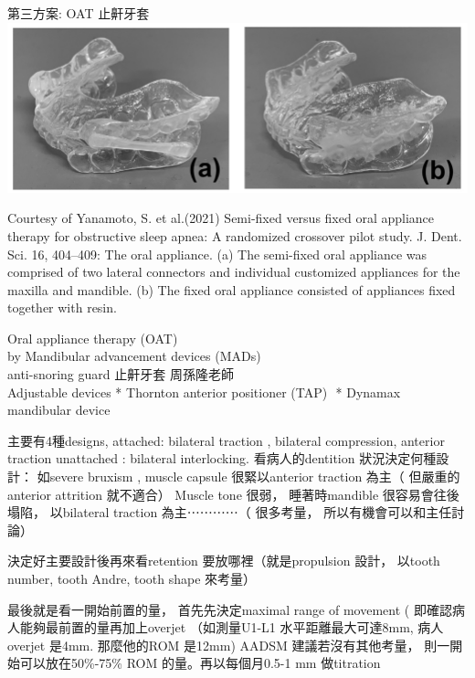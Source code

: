 \documentclass[aspectratio=169]{beamer}
\begin{document}
\begin{frame}{第三方案: OAT 止鼾牙套}
\centering
\includegraphics[height=0.30\textwidth]{Yanamoto2021.jpg}
\par Courtesy of Yanamoto, S. et al.(2021) Semi-fixed versus fixed oral appliance therapy for obstructive sleep apnea: A randomized crossover pilot study. J. Dent. Sci. 16, 404–409: The oral appliance. (a) The semi-fixed oral appliance was comprised of two lateral connectors and individual customized appliances for the maxilla and mandible. (b) The fixed oral appliance consisted of appliances fixed together with resin.


\begin{block}
Oral appliance therapy (OAT)\\
by
Mandibular advancement devices (MADs)\\
anti-snoring guard 止鼾牙套 周孫隆老師\\

Adjustable devices
* Thornton anterior positioner (TAP) 
* Dynamax mandibular device

    主要有4種designs, 
attached: bilateral traction , bilateral compression, anterior traction 
unattached : bilateral interlocking. 
看病人的dentition 狀況決定何種設計： 如severe bruxism , muscle capsule 很緊以anterior traction 為主（ 但嚴重的anterior attrition 就不適合） 
Muscle tone 很弱， 睡著時mandible 很容易會往後塌陷， 以bilateral traction 為主⋯⋯⋯⋯（ 很多考量， 所以有機會可以和主任討論） 

決定好主要設計後再來看retention 要放哪裡（就是propulsion 設計， 以tooth number, tooth Andre, tooth shape 來考量） 

最後就是看一開始前置的量， 首先先決定maximal range of movement ( 即確認病人能夠最前置的量再加上overjet （如測量U1-L1 水平距離最大可達8mm, 病人overjet 是4mm. 那麼他的ROM 是12mm) 
AADSM 建議若沒有其他考量， 則一開始可以放在50\%-75\% ROM 的量。再以每個月0.5-1 mm 做titration
\end{block}

\end{frame}
\end{document}

